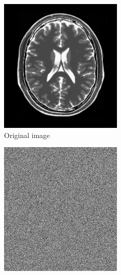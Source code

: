 \documentclass[UTF8]{ctexart}
\begin{document}
\begin{figure}[htbp]
    \centering
    \begin{subfigure}{0.3\textwidth}
        \centering
        \includegraphics[width=\linewidth]{brainimg.png}
        \caption{Original image}
    \end{subfigure}%
    \hfill
    \begin{subfigure}{0.3\textwidth}
        \centering
        \includegraphics[width=\linewidth]{white_noise1.png}

\end{subfigure}
\end{figure}
\end{document}
